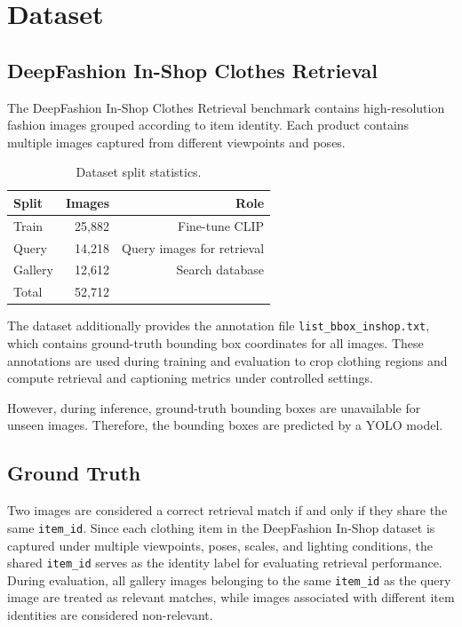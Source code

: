\documentclass[12pt,a4paper]{article}
\begin{document}
\section{Dataset}

\subsection{DeepFashion In-Shop Clothes Retrieval}

The DeepFashion In-Shop Clothes Retrieval benchmark contains high-resolution
fashion images grouped according to item identity. Each product contains
multiple images captured from different viewpoints and poses.

\begin{table}[H]
\centering
\caption{Dataset split statistics.}
\begin{tabular}{lrr}
\toprule
\textbf{Split} & \textbf{Images} & \textbf{Role} \\
\midrule
Train   & 25,882 & Fine-tune CLIP \\
Query   & 14,218 & Query images for retrieval \\
Gallery & 12,612 & Search database \\
\midrule
Total   & 52,712 & \\
\bottomrule
\end{tabular}
\end{table}

The dataset additionally provides the annotation file \texttt{list\_bbox\_inshop.txt}, which contains ground-truth bounding box coordinates for all images. These annotations are used during training and evaluation to crop clothing regions and compute retrieval and captioning metrics under controlled settings.

However, during inference, ground-truth bounding boxes are unavailable for unseen images. Therefore, the bounding boxes are predicted by a YOLO model.

\subsection{Ground Truth}

Two images are considered a correct retrieval match if and only if they
share the same \texttt{item\_id}. Since each clothing item in the
DeepFashion In-Shop dataset is captured under multiple viewpoints,
poses, scales, and lighting conditions, the shared \texttt{item\_id}
serves as the identity label for evaluating retrieval performance.
During evaluation, all gallery images belonging to the same
\texttt{item\_id} as the query image are treated as relevant matches,
while images associated with different item identities are considered
non-relevant.
\end{document}
